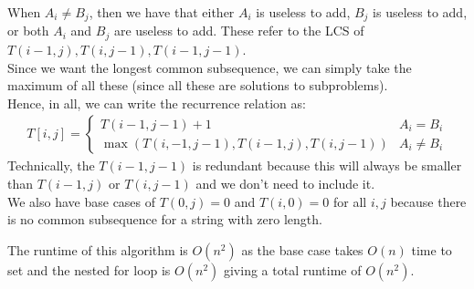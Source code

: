 \documentclass[14pt]{extarticle}
\begin{document}
    When $A_i \neq B_j$, then we have that either $A_i$ is useless to add,
    $B_j$ is useless to add, or both $A_i$ and $B_j$ are useless to add.
    These refer to the LCS of $T(i - 1, j), T(i, j-1), T(i-1, j-1)$.\\

    Since we want the longest common subsequence, we can simply take
    the maximum of all these (since all these are solutions to subproblems).\\

    Hence, in all, we can write the recurrence relation as:
    \begin{align*}
        T[i, j] = \begin{cases}
            T(i - 1, j - 1) + 1         & A_i = B_i         \\
            \max\left(
                T(i, - 1, j - 1), T(i - 1, j), T(i, j - 1)
            \right) & A_i \neq B_i
        \end{cases}
    \end{align*}
    Technically, the $T(i-1, j-1)$ is redundant because this will always be
    smaller than $T(i - 1, j)$ or $T(i, j - 1)$ and we don't need to include
    it.\\

    We also have base cases of $T(0, j) = 0$ and $T(i, 0) = 0$ for all $i, j$
    because there is no common subsequence for a string with zero length.\\
    \begin{algorithm}[H]
    \end{algorithm}
    The runtime of this algorithm is $O(n^2)$ as the base case takes $O(n)$
    time to set and the nested for loop is $O(n^2)$ giving a total runtime of
    $O(n^2)$.
\end{document}
